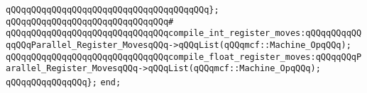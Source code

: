 \verb|qQQqqQQqqQQqqQQqqQQqqQQqqQQqqQQqqQQqqQQq};|\newline
\verb|qQQqqQQqqQQqqQQqqQQqqQQqqQQqqQQq#|\newline
\verb|qQQqqQQqqQQqqQQqqQQqqQQqqQQqqQQqcompile_int_register_moves:qQQqqQQqqQQqqQQqParallel_Register_MovesqQQq->qQQqList(qQQqmcf::Machine_OpqQQq);|\newline
\verb|qQQqqQQqqQQqqQQqqQQqqQQqqQQqqQQqcompile_float_register_moves:qQQqqQQqParallel_Register_MovesqQQq->qQQqList(qQQqmcf::Machine_OpqQQq);|\newline
\verb|qQQqqQQqqQQqqQQq};|\newline
\verb|end;|\newline

